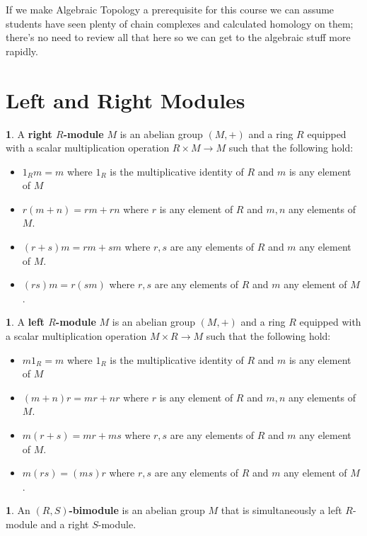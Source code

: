 \documentclass[oneside,english]{amsbook}
\numberwithin{section}{chapter}
\theoremstyle{plain}
\theoremstyle{definition}
\newtheorem{defn}[thm]{\protect\definitionname}
\providecommand{\definitionname}{Definition}
\begin{document}
	If we make Algebraic Topology a prerequisite for this course we can assume students have seen plenty of chain complexes and calculated homology on them; there's no need to review all that here so we can get to the algebraic stuff more rapidly.
	
	\section{Left and Right Modules}
	
		\begin{defn}
			A \textbf{right $R$-module} $M$ is an abelian group $(M, +)$ and a ring $R$ equipped with a scalar multiplication operation $R\times M\to M$ such that the following hold:
			\begin{itemize}
				\item $1_Rm = m$ where $1_R$ is the multiplicative identity of $R$ and $m$ is any element of $M$
				\item $r(m + n) = rm + rn$ where $r$ is any element of $R$ and $m, n$ any elements of $M$.
				\item $(r + s)m = rm + sm$ where $r, s$ are any elements of $R$ and $m$ any element of $M$.
				\item $(rs)m = r(sm)$ where $r, s$ are any elements of $R$ and $m$ any element of $M$.
			\end{itemize}
		\end{defn}
	
		\begin{defn}
			A \textbf{left $R$-module} $M$ is an abelian group $(M, +)$ and a ring $R$ equipped with a scalar multiplication operation $M\times R\to M$ such that the following hold:
			\begin{itemize}
				\item $m1_R = m$ where $1_R$ is the multiplicative identity of $R$ and $m$ is any element of $M$
				\item $(m + n)r = mr + nr$ where $r$ is any element of $R$ and $m, n$ any elements of $M$.
				\item $m(r + s) = mr + ms$ where $r, s$ are any elements of $R$ and $m$ any element of $M$.
				\item $m(rs) = (ms)r$ where $r, s$ are any elements of $R$ and $m$ any element of $M$.
			\end{itemize}
		\end{defn}
		
		\begin{defn}
			An \textbf{$(R, S)$-bimodule} is an abelian group $M$ that is simultaneously a left $R$-module and a right $S$-module.
		\end{defn}
		
\end{document}
